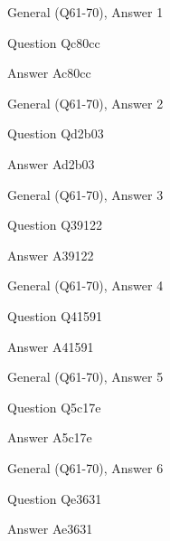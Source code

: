 \documentclass[11pt]{beamer}
\begin{document}
\begin{frame}[t]{General (Q61-70), Answer 1}
\vspace{2em}
\begin{block}{Question}
Qc80cc
\end{block}
\pause{}
\begin{block}{Answer}
Ac80cc
\end{block}
\end{frame}
    

\begin{frame}[t]{General (Q61-70), Answer 2}
\vspace{2em}
\begin{block}{Question}
Qd2b03
\end{block}
\pause{}
\begin{block}{Answer}
Ad2b03
\end{block}
\end{frame}
    

\begin{frame}[t]{General (Q61-70), Answer 3}
\vspace{2em}
\begin{block}{Question}
Q39122
\end{block}
\pause{}
\begin{block}{Answer}
A39122
\end{block}
\end{frame}
    

\begin{frame}[t]{General (Q61-70), Answer 4}
\vspace{2em}
\begin{block}{Question}
Q41591
\end{block}
\pause{}
\begin{block}{Answer}
A41591
\end{block}
\end{frame}
    

\begin{frame}[t]{General (Q61-70), Answer 5}
\vspace{2em}
\begin{block}{Question}
Q5c17e
\end{block}
\pause{}
\begin{block}{Answer}
A5c17e
\end{block}
\end{frame}
    

\begin{frame}[t]{General (Q61-70), Answer 6}
\vspace{2em}
\begin{block}{Question}
Qe3631
\end{block}
\pause{}
\begin{block}{Answer}
Ae3631
\end{block}
\end{frame}
    
\end{document}
